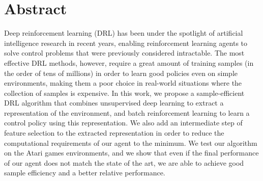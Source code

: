 \newpage
\chapter*{Abstract}


\vspace{0.5cm}

Deep reinforcement learning (DRL) has been under the spotlight of artificial 
intelligence research in recent years, enabling reinforcement learning agents 
to solve control problems that were previously considered intractable. 
The most effective DRL methods, however, require a great amount of training 
samples (in the order of tens of millions) in order to learn good policies
even on simple environments, making them a poor choice in real-world situations
where the collection of samples is expensive.
In this work, we propose a sample-efficient DRL algorithm that combines 
unsupervised deep learning to extract a representation of the environment, and 
batch reinforcement learning to learn a control policy using this representation.
We also add an intermediate step of feature selection to the extracted 
representation in order to reduce the computational requirements of our agent to 
the minimum.
We test our algorithm on the Atari games environments, and we show that even if
the final performance of our agent does not match the state of the art, we are
able to achieve good sample efficiency and a better relative performance.
